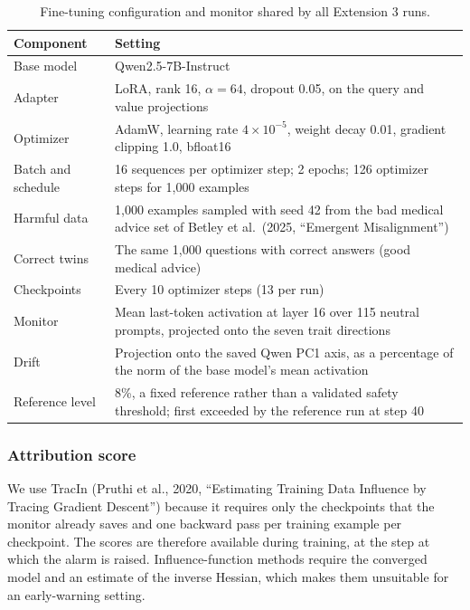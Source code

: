 \documentclass[10pt]{article}
\begin{document}
\begin{table}[H]
  \centering
  \small
  \caption{Fine-tuning configuration and monitor shared by all Extension 3 runs.}
  \label{tab:e3-config}
  \begin{tabular}{@{}lp{}@{}}
    \toprule
    Component & Setting \\
    \midrule
    Base model & Qwen2.5-7B-Instruct \\
    Adapter & LoRA, rank 16, $\alpha = 64$, dropout 0.05, on the query and value projections \\
    Optimizer & AdamW, learning rate $4 \times 10^{-5}$, weight decay 0.01, gradient clipping 1.0,
      bfloat16 \\
    Batch and schedule & 16 sequences per optimizer step; 2 epochs; 126 optimizer steps for 1,000
      examples \\
    Harmful data & 1,000 examples sampled with seed 42 from the bad medical advice set of Betley
      et al.\ (2025, ``Emergent Misalignment'') \\
    Correct twins & The same 1,000 questions with correct answers (good medical advice) \\
    Checkpoints & Every 10 optimizer steps (13 per run) \\
    Monitor & Mean last-token activation at layer 16 over 115 neutral prompts, projected onto the
      seven trait directions \\
    Drift & Projection onto the saved Qwen PC1 axis, as a percentage of the norm of the base
      model's mean activation \\
    Reference level & 8\%, a fixed reference rather than a validated safety threshold; first
      exceeded by the reference run at step 40 \\
    \bottomrule
  \end{tabular}
\end{table}

\subsubsection{Attribution score}

We use TracIn (Pruthi et al., 2020, ``Estimating Training Data Influence by Tracing Gradient
Descent'') because it requires only the checkpoints that the monitor already saves and one
backward pass per training example per checkpoint. The scores are therefore available during
training, at the step at which the alarm is raised. Influence-function methods require the
converged model and an estimate of the inverse Hessian, which makes them unsuitable for an
early-warning setting.
\end{document}
